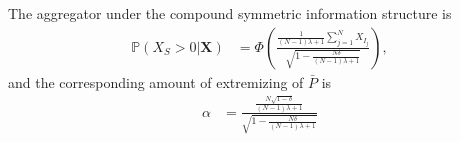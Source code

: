 \documentclass[11pt]{article}
\renewcommand{\P}{\mathbb{P}}
\theoremstyle{definition}
\theoremstyle{definition}
\begin{document}
The  aggregator under the compound symmetric information structure is
\begin{align}
\P\left(X_S > 0 | \boldsymbol{X}\right) &=\Phi\left(\frac{\frac{1}{(N-1)\lambda +1} \sum_{j=1}^N X_{I_j} }{\sqrt{1- \frac{N\delta}{(N-1)\lambda +1} }}  \right), \label{CompoundAggre}
\end{align}
and the corresponding amount of extremizing of $\bar{P}$ is
\begin{align}
\alpha &= \frac{\frac{N\sqrt{1-\delta}}{(N-1)\lambda +1}}{\sqrt{1- \frac{N\delta}{(N-1)\lambda +1} }} \label{CompoundAlpha}
\end{align}
\end{document}
